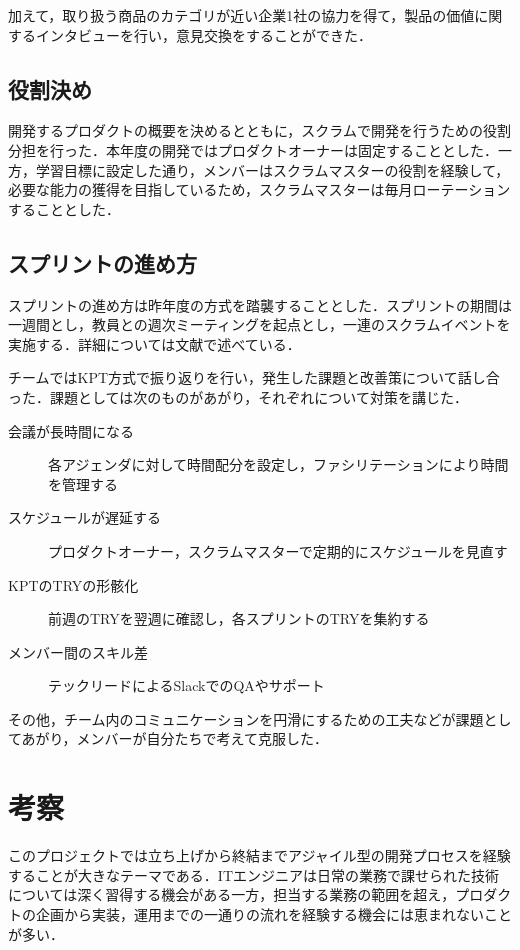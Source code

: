 \documentclass[fontsize=9pt, jafontscale=.95, twocolumn, a4paper]{jlreq}
\begin{document}
加えて，取り扱う商品のカテゴリが近い企業1社の協力を得て，製品の価値に関するインタビューを行い，意見交換をすることができた．

\subsection{役割決め}
\label{sec:org32a315d}

開発するプロダクトの概要を決めるとともに，スクラムで開発を行うための役割分担を行った．本年度の開発ではプロダクトオーナーは固定することとした．一方，学習目標に設定した通り，メンバーはスクラムマスターの役割を経験して，必要な能力の獲得を目指しているため，スクラムマスターは毎月ローテーションすることとした．

\subsection{スプリントの進め方}
\label{sec:orgea59ba2}

スプリントの進め方は昨年度の方式を踏襲することとした．スプリントの期間は一週間とし，教員との週次ミーティングを起点とし，一連のスクラムイベントを実施する．詳細については文献\cite{中鉢2209}で述べている．

チームではKPT方式で振り返りを行い，発生した課題と改善策について話し合った．課題としては次のものがあがり，それぞれについて対策を講じた．

\begin{description} %
\item[{会議が長時間になる}]

各アジェンダに対して時間配分を設定し，ファシリテーションにより時間を管理する
\item[{スケジュールが遅延する}]

プロダクトオーナー，スクラムマスターで定期的にスケジュールを見直す
\item[{KPTのTRYの形骸化}]

前週のTRYを翌週に確認し，各スプリントのTRYを集約する
\item[{メンバー間のスキル差}]

テックリードによるSlackでのQAやサポート
\end{description}

その他，チーム内のコミュニケーションを円滑にするための工夫などが課題としてあがり，メンバーが自分たちで考えて克服した．

\section{考察}
\label{sec:org365d5f3}
このプロジェクトでは立ち上げから終結までアジャイル型の開発プロセスを経験することが大きなテーマである．ITエンジニアは日常の業務で課せられた技術については深く習得する機会がある一方，担当する業務の範囲を超え，プロダクトの企画から実装，運用までの一通りの流れを経験する機会には恵まれないことが多い．
\end{document}
